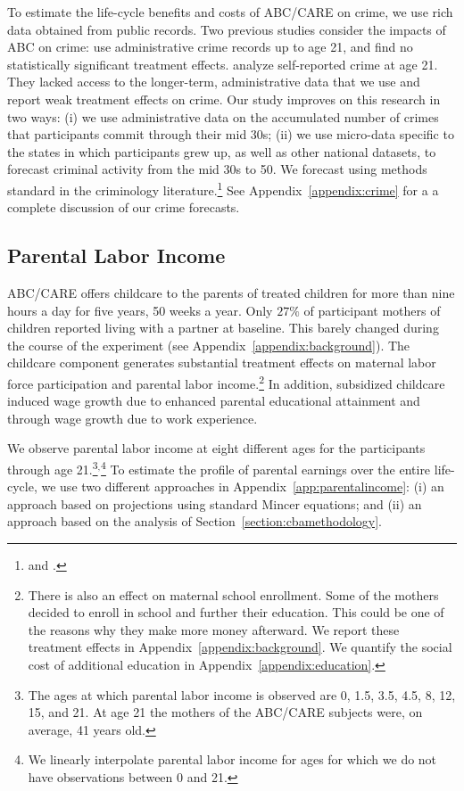 \noindent To estimate the life-cycle benefits and costs of ABC/CARE on crime, we use rich data obtained from public records. Two previous studies consider the impacts of ABC on crime: \citet{Clarke_Campbell_1998_ABC_Comparison_ECRQ} use administrative crime records up to age 21, and find no statistically significant treatment effects. \cite{Barnett_Masse_2002_benefitcost,Barnett_Masse_2007_EER} analyze self-reported crime at age 21. They lacked access to the longer-term, administrative data that we use and report weak treatment effects on crime. Our study improves on this research in two ways: (i) we use administrative data on the accumulated number of crimes that participants commit through their mid 30s; (ii) we use micro-data specific to the states in which participants grew up, as well as other national datasets, to forecast criminal activity from the mid 30s to 50. We forecast using methods standard in the criminology literature.\footnote{\citet{Cohen-Bowles_2010_Estimating-Cost-Crime} and \citet{McCollister_etal_2010_DAD}.} See Appendix~\ref{appendix:crime} for a a complete discussion of our crime forecasts.

\subsection{Parental Labor Income} \label{section:pincome}

\noindent ABC/CARE offers childcare to the parents of treated children for more than nine hours a day for five years, 50 weeks a year. Only $27\%$ of participant mothers of children reported living with a partner at baseline. This barely changed during the course of the experiment (see Appendix~\ref{appendix:background}). The childcare component generates substantial treatment effects on maternal labor force participation and parental labor income.\footnote{There is also an effect on maternal school enrollment. Some of the mothers decided to enroll in school and further their education. This could be one of the reasons why they make more money afterward. We report these treatment effects in Appendix~\ref{appendix:background}. We quantify the social cost of additional education in Appendix~\ref{appendix:education}.} In addition, subsidized childcare induced wage growth due to enhanced parental educational attainment and through wage growth due to work experience.

We observe parental labor income at eight different ages for the participants through age 21.\footnote{The ages at which parental labor income is observed are 0, 1.5, 3.5, 4.5, 8, 12, 15, and 21. At age 21 the mothers of the ABC/CARE subjects were, on average, 41 years old.}$^,$\footnote{We linearly interpolate parental labor income for ages for which we do not have observations between 0 and 21.} To estimate the profile of parental earnings over the entire life-cycle, we use two different approaches in Appendix~\ref{app:parentalincome}: (i) an approach based on projections using standard Mincer equations; and (ii) an approach based on the analysis of Section~\ref{section:cbamethodology}.


